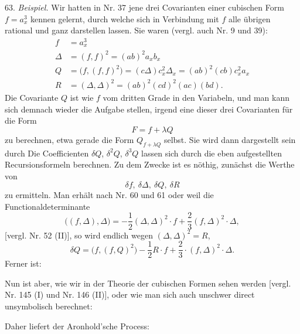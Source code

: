 63. \textit{Beispiel.} Wir hatten in Nr. 37 jene drei Covarianten einer cubischen Form $f=a_x^3$ kennen gelernt, durch welche sich in Verbindung mit $f$ alle übrigen rational und ganz darstellen lassen. Sie waren (vergl. auch Nr. 9 und 39):
\[
\begin{aligned}
f &= a_x^3\\
\Delta &= (f,f)^2 = (ab)^2a_xb_x\\
Q &= \big(f,(f,f)^2\big) = (c\Delta)c_x^2\Delta_x = (ab)^2(cb)c_x^2a_x\\
R &= (\Delta,\Delta)^2 = (ab)^2(cd)^2(ac)(bd).
\end{aligned}
\]
Die Covariante $Q$ ist wie $f$ vom dritten Grade in den Variabeln, und man kann sich demnach wieder die Aufgabe stellen, irgend eine dieser drei Covarianten für die Form
\[
F = f + \lambda Q
\]
zu berechnen, etwa gerade die Form $Q_{f+\lambda Q}$ selbst. Sie wird dann dargestellt sein durch
Die Coefficienten $\delta Q$, $\delta^2 Q$, $\delta^3 Q$ lassen sich durch die eben aufgestellten Recursionsformeln berechnen. Zu dem Zwecke ist es nöthig, zunächst die Werthe von
\[
\delta f,\ \delta\Delta,\ \delta Q,\ \delta R
\]
zu ermitteln. Man erhält nach Nr. 60 und 61
oder weil die Functionaldeterminante
\[
\big((f,\Delta),\Delta\big) = -\frac{1}{2}(\Delta,\Delta)^2\cdot f + \frac{2}{3}(f,\Delta)^2\cdot\Delta,
\]
[vergl. Nr. 52 (II)], so wird endlich wegen $(\Delta,\Delta)^2=R$,
\[
\delta Q = \big(f,(f,Q)^2\big) - \frac{1}{2}R\cdot f + \frac{2}{3}\cdot(f,\Delta)^2\cdot\Delta.
\]
Ferner ist:


Nun ist aber, wie wir in der Theorie der cubischen Formen sehen werden [vergl. Nr. 145 (I) und Nr. 146 (II)], oder wie man sich auch unschwer direct unsymbolisch berechnet:

Daher liefert der Aronhold'sche Process:


